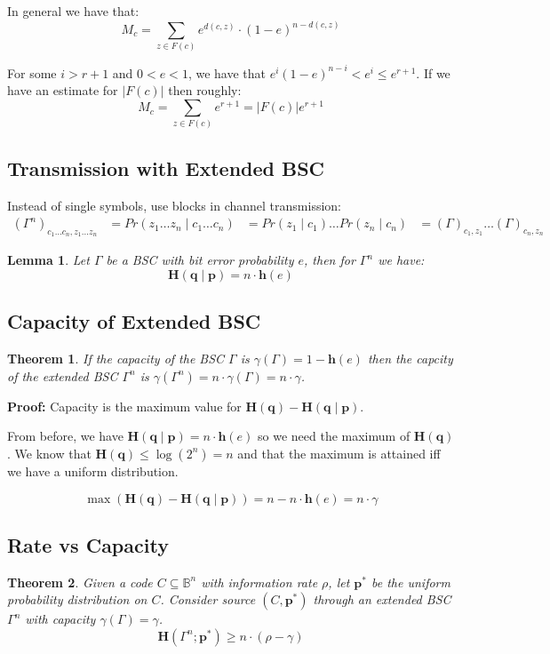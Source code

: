 \documentclass[11pt]{article}
\newtheorem{theo}{Theorem}
\newtheorem{lem}{Lemma}
\begin{document}
In general we have that:
\[
  M_c = \sum_{z \in F(c)} e^{d(c, z)} \cdot (1 - e)^{n - d(c, z)}
\]

For some $i > r + 1$ and $0 < e < 1$, we have that $e^i (1 - e)^{n - i} < e^i \leq e^{r + 1}$.
If we have an estimate for $\lvert F (c) \rvert$ then roughly:
\[
  M_c = \sum_{z \in F(c)} e^{r + 1} = \lvert F(c) \rvert e^{r + 1}
\]

\subsection{Transmission with Extended BSC}
Instead of single symbols, use blocks in channel transmission:
\begin{align*}
  (\Gamma^n)_{c_1 \ldots c_n, z_1 \ldots z_n} &= Pr(z_1 \ldots z_n \mid c_1 \ldots c_n)
  &= Pr(z_1 \mid c_1) \ldots Pr(z_n \mid c_n)
  &= (\Gamma)_{c_1, z_1} \ldots (\Gamma)_{c_n, z_n}
\end{align*}

\begin{lem}
  Let $\Gamma$ be a BSC with bit error probability $e$, then for $\Gamma^n$ we have:
  \[
    \textbf{H}(\textbf{q} \mid \textbf{p}) = n \cdot \textbf{h}(e)
  \]
\end{lem}

\subsection{Capacity of Extended BSC}
\begin{theo}
  If the capacity of the BSC $\Gamma$ is $\gamma(\Gamma) = 1 - \textbf{h}(e)$ then the capcity of the extended BSC $\Gamma^n$ is $\gamma(\Gamma^n) = n \cdot \gamma(\Gamma) = n \cdot \gamma$.
\end{theo}

\textbf{Proof:}
Capacity is the maximum value for $\textbf{H} (\textbf{q}) - \textbf{H}(\textbf{q} \mid \textbf{p})$.

From before, we have $\textbf{H}(\textbf{q} \mid \textbf{p}) = n \cdot \textbf{h}(e)$ so we need the maximum of $\textbf{H} (\textbf{q})$.
We know that $\textbf{H} (\textbf{q}) \leq \log(2^n) = n$ and that the maximum is attained iff we have a uniform distribution.

\[
  \max(\textbf{H} (\textbf{q}) - \textbf{H}(\textbf{q} \mid \textbf{p})) = n - n \cdot \textbf{h}(e) = n \cdot \gamma
\]

\subsection{Rate vs Capacity}
\begin{theo}
  Given a code $C \subseteq \mathbb{B}^n$ with information rate $\rho$, let $\textbf{p}^*$ be the uniform probability distribution on $C$.
  Consider source $(C, \textbf{p}^*)$ through an extended BSC $\Gamma^n$ with capacity $\gamma(\Gamma) = \gamma$.
  \[
    \textbf{H}(\Gamma^n ; \textbf{p}^*) \geq n \cdot (\rho - \gamma)
  \]
\end{theo}
\end{document}
